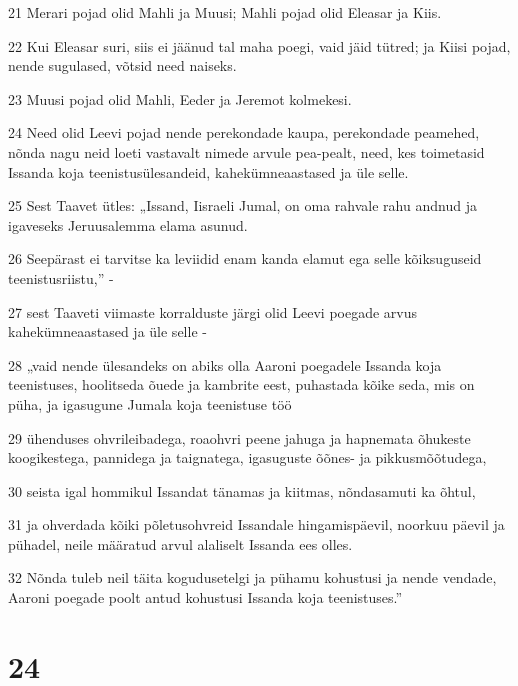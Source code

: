 \par 21 Merari pojad olid Mahli ja Muusi; Mahli pojad olid Eleasar ja Kiis.
\par 22 Kui Eleasar suri, siis ei jäänud tal maha poegi, vaid jäid tütred; ja Kiisi pojad, nende sugulased, võtsid need naiseks.
\par 23 Muusi pojad olid Mahli, Eeder ja Jeremot kolmekesi.
\par 24 Need olid Leevi pojad nende perekondade kaupa, perekondade peamehed, nõnda nagu neid loeti vastavalt nimede arvule pea-pealt, need, kes toimetasid Issanda koja teenistusülesandeid, kahekümneaastased ja üle selle.
\par 25 Sest Taavet ütles: „Issand, Iisraeli Jumal, on oma rahvale rahu andnud ja igaveseks Jeruusalemma elama asunud.
\par 26 Seepärast ei tarvitse ka leviidid enam kanda elamut ega selle kõiksuguseid teenistusriistu,” -
\par 27 sest Taaveti viimaste korralduste järgi olid Leevi poegade arvus kahekümneaastased ja üle selle -
\par 28 „vaid nende ülesandeks on abiks olla Aaroni poegadele Issanda koja teenistuses, hoolitseda õuede ja kambrite eest, puhastada kõike seda, mis on püha, ja igasugune Jumala koja teenistuse töö
\par 29 ühenduses ohvrileibadega, roaohvri peene jahuga ja hapnemata õhukeste koogikestega, pannidega ja taignatega, igasuguste õõnes- ja pikkusmõõtudega,
\par 30 seista igal hommikul Issandat tänamas ja kiitmas, nõndasamuti ka õhtul,
\par 31 ja ohverdada kõiki põletusohvreid Issandale hingamispäevil, noorkuu päevil ja pühadel, neile määratud arvul alaliselt Issanda ees olles.
\par 32 Nõnda tuleb neil täita kogudusetelgi ja pühamu kohustusi ja nende vendade, Aaroni poegade poolt antud kohustusi Issanda koja teenistuses.”

\chapter{24}

